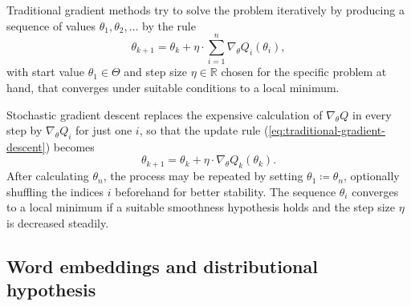 \documentclass{amsart}
\theoremstyle{plain}
\theoremstyle{definition}
\newcommand{\R}{\mathbb{R}}
\begin{document}
Traditional gradient methods try to solve the problem iteratively by producing a sequence of values $\theta_1, \theta_2, \dots$ by the rule
\begin{equation}
  \label{eq:traditional-gradient-descent}
  \theta_{k + 1} = \theta_{k} + \eta \cdot \sum_{i = 1}^n \nabla_\theta Q_i(\theta_i),
\end{equation}
with start value $\theta_1 \in \Theta$ and step size $\eta \in \R$ chosen for the specific problem at hand, that converges under suitable conditions to a local minimum.

Stochastic gradient descent replaces the expensive calculation of $\nabla_\theta Q$ in every step by $\nabla_\theta Q_i$ for just one $i$, so that the update rule (\ref{eq:traditional-gradient-descent}) becomes
\begin{equation}
  \label{eq:stochastic-gradient-descent}
  \theta_{k + 1} = \theta_k + \eta \cdot \nabla_\theta Q_k(\theta_k).
\end{equation}
After calculating $\theta_n$, the process may be repeated by setting $\theta_1 \coloneqq \theta_n$, optionally shuffling the indices $i$ beforehand for better stability.
The sequence $\theta_i$ converges to a local minimum if a suitable smoothness hypothesis holds and the step size $\eta$ is decreased steadily.

\subsection{Word embeddings and distributional hypothesis}
\end{document}
